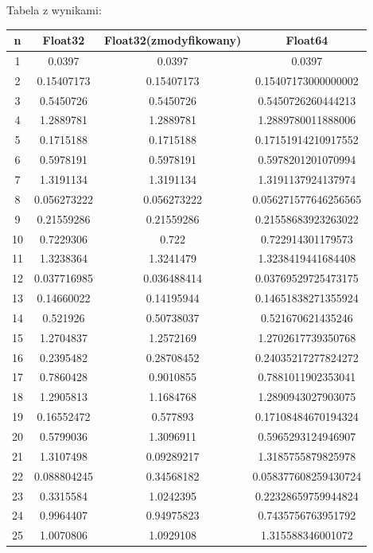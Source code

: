 \documentclass[8pt,letterpaper]{article}
\begin{document}
\begin{center}
Tabela z wynikami:
\\
\begin{tabular}{|c|c|c|c|}
\hline

	n&	Float32 & Float32(zmodyfikowany) & Float64 \\
	\hline
	\hline
	1 & 0.0397 & 0.0397 & 0.0397 \\
2 & 0.15407173 & 0.15407173 & 0.15407173000000002 \\
3 & 0.5450726 & 0.5450726 & 0.5450726260444213 \\
4 & 1.2889781 & 1.2889781 & 1.2889780011888006 \\
5 & 0.1715188 & 0.1715188 & 0.17151914210917552 \\
6 & 0.5978191 & 0.5978191 & 0.5978201201070994 \\
7 & 1.3191134 & 1.3191134 & 1.3191137924137974 \\
8 & 0.056273222 & 0.056273222 & 0.056271577646256565 \\
9 & 0.21559286 & 0.21559286 & 0.21558683923263022 \\
10 & 0.7229306 & 0.722 & 0.722914301179573 \\
11 & 1.3238364 & 1.3241479 & 1.3238419441684408 \\
12 & 0.037716985 & 0.036488414 & 0.03769529725473175 \\
13 & 0.14660022 & 0.14195944 & 0.14651838271355924 \\
14 & 0.521926 & 0.50738037 & 0.521670621435246 \\
15 & 1.2704837 & 1.2572169 & 1.2702617739350768 \\
16 & 0.2395482 & 0.28708452 & 0.24035217277824272 \\
17 & 0.7860428 & 0.9010855 & 0.7881011902353041 \\
18 & 1.2905813 & 1.1684768 & 1.2890943027903075 \\
19 & 0.16552472 & 0.577893 & 0.17108484670194324 \\
20 & 0.5799036 & 1.3096911 & 0.5965293124946907 \\
21 & 1.3107498 & 0.09289217 & 1.3185755879825978 \\
22 & 0.088804245 & 0.34568182 & 0.058377608259430724 \\
23 & 0.3315584 & 1.0242395 & 0.22328659759944824 \\
24 & 0.9964407 & 0.94975823 & 0.7435756763951792 \\
25 & 1.0070806 & 1.0929108 & 1.315588346001072 \\

\end{tabular}
\end{center}
\end{document}
